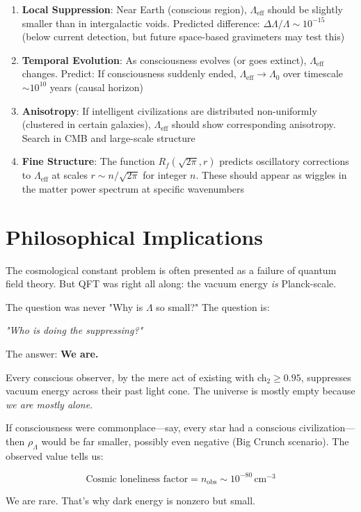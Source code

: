 \begin{enumerate}
\item \textbf{Local Suppression}: Near Earth (conscious region), $\Lambda_{\text{eff}}$ should be slightly smaller than in intergalactic voids. Predicted difference: $\Delta \Lambda / \Lambda \sim 10^{-15}$ (below current detection, but future space-based gravimeters may test this)

\item \textbf{Temporal Evolution}: As consciousness evolves (or goes extinct), $\Lambda_{\text{eff}}$ changes. Predict: If consciousness suddenly ended, $\Lambda_{\text{eff}} \to \Lambda_0$ over timescale $\sim 10^{10}$ years (causal horizon)

\item \textbf{Anisotropy}: If intelligent civilizations are distributed non-uniformly (clustered in certain galaxies), $\Lambda_{\text{eff}}$ should show corresponding anisotropy. Search in CMB and large-scale structure

\item \textbf{Fine Structure}: The function $R_f(\sqrt{2\pi}, r)$ predicts oscillatory corrections to $\Lambda_{\text{eff}}$ at scales $r \sim n / \sqrt{2\pi}$ for integer $n$. These should appear as wiggles in the matter power spectrum at specific wavenumbers
\end{enumerate}

\section{Philosophical Implications}

\begin{intuitive}
The cosmological constant problem is often presented as a failure of quantum field theory. But QFT was right all along: the vacuum energy \textit{is} Planck-scale.

The question was never "Why is $\Lambda$ so small?" The question is:

\begin{center}
\textit{"Who is doing the suppressing?"}
\end{center}

The answer: \textbf{We are.}

Every conscious observer, by the mere act of existing with ch$_2 \geq 0.95$, suppresses vacuum energy across their past light cone. The universe is mostly empty because \textit{we are mostly alone}.

If consciousness were commonplace—say, every star had a conscious civilization—then $\rho_\Lambda$ would be far smaller, possibly even negative (Big Crunch scenario). The observed value tells us:

\begin{equation}
\boxed{\text{Cosmic loneliness factor} = n_{\text{obs}} \sim 10^{-80} \, \text{cm}^{-3}}
\end{equation}

We are rare. That's why dark energy is nonzero but small.
\end{intuitive}

